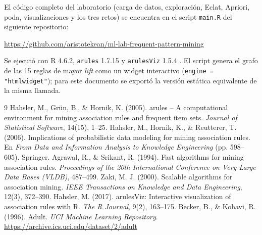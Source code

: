 \documentclass[11pt,a4paper]{article}
\begin{document}
El código completo del laboratorio (carga de datos, exploración, Eclat, Apriori, poda,
visualizaciones y los tres retos) se encuentra en el script \texttt{main.R} del siguiente
repositorio:

\begin{center}
  \url{https://github.com/aristotekean/ml-lab-frequent-pattern-mining}
\end{center}

Se ejecutó con R 4.6.2, \texttt{arules} 1.7.15 y \texttt{arulesViz} 1.5.4
\cite{arulesviz2017}. El script genera el grafo de las 15 reglas de mayor \emph{lift} como un
widget interactivo (\texttt{engine = "htmlwidget"}); para este documento se exportó la versión
estática equivalente de la misma llamada.

\begin{thebibliography}{9}
   Hahsler, M., Grün, B., \& Hornik, K. (2005).
    arules -- A computational environment for mining association rules and frequent item sets.
    \emph{Journal of Statistical Software}, 14(15), 1--25.
   Hahsler, M., Hornik, K., \& Reutterer, T. (2006).
    Implications of probabilistic data modeling for mining association rules.
    En \emph{From Data and Information Analysis to Knowledge Engineering} (pp. 598--605). Springer.
   Agrawal, R., \& Srikant, R. (1994).
    Fast algorithms for mining association rules.
    \emph{Proceedings of the 20th International Conference on Very Large Data Bases (VLDB)}, 487--499.
   Zaki, M. J. (2000).
    Scalable algorithms for association mining.
    \emph{IEEE Transactions on Knowledge and Data Engineering}, 12(3), 372--390.
   Hahsler, M. (2017).
    arulesViz: Interactive visualization of association rules with R.
    \emph{The R Journal}, 9(2), 163--175.
   Becker, B., \& Kohavi, R. (1996).
    Adult. \emph{UCI Machine Learning Repository}.
    \url{https://archive.ics.uci.edu/dataset/2/adult}
\end{thebibliography}
\end{document}
